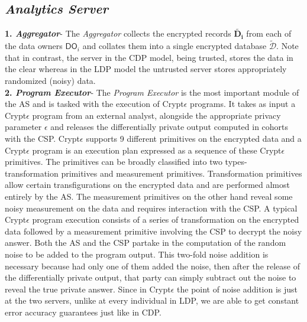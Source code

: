 \subsection*{\textit{Analytics Server}}

\textbf{1.\textit{ Aggregator}}- The \textit{Aggregator} collects the encrypted records $\mathbf{\tilde{D_i}}$ from each of the data owners $\textsf{DO}_i$ and collates them into a single encrypted database $\boldsymbol{\tilde{\mathcal{D}}}$. Note that in contrast, the server in the \textsf{CDP} model, being trusted, stores the data in the clear whereas in the \textsf{LDP} model the untrusted server stores appropriately randomized (noisy) data.    \\\textbf{2.\textit{ Program Executor}}- The \textit{Program Executor} is the most important module of the \textsf{AS} and is tasked with the execution of Crypt$\epsilon$ programs. It takes as input a Crypt$\epsilon$ program from an external analyst, alongside the appropriate privacy parameter $\epsilon$ and releases the differentially private output computed in cohorts with the CSP. Crypt$\epsilon$ supports 9 different primitives on the encrypted data and a Crypt$\epsilon$ program is an execution plan expressed as a sequence of these Crypt$\epsilon$ primitives. The primitives can be broadly classified into two types- transformation primitives and measurement primitives. Transformation primitives allow certain transfigurations on the encrypted data and are performed almost entirely by the \textsf{AS}. The measurement primitives on the other hand reveal some noisy measurement on the data and requires interaction with the \textsf{CSP}. A typical Crypt$\epsilon$ program execution consists of  a series of transformation on the encrypted data followed by a measurement primitive involving the \textsf{CSP} to decrypt the noisy answer. Both the \textsf{AS} and the \textsf{CSP} partake in the computation of the random noise to be added to the program output. This two-fold noise addition is necessary because  had only one of them added the noise, then after the release of the differentially private output, that party can simply subtract out the noise to reveal the true private answer. Since in Crypt$\epsilon$ the point of noise addition is just at the two servers, unlike at every individual in \textsf{LDP}, we are able to get constant error accuracy guarantees just like in \textsf{CDP}. 
